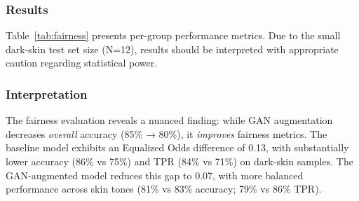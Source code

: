 \documentclass[10pt, twocolumn, letterpaper]{article}
\begin{document}
\subsubsection{Results}
Table~\ref{tab:fairness} presents per-group performance metrics. Due to the small dark-skin test set size (N=12), results should be interpreted with appropriate caution regarding statistical power.

\begin{table}[h]
\centering
\caption{Fairness Evaluation: Performance by Skin Tone Group}
\label{tab:fairness}
\vspace{0.2cm}
\end{table}

\subsubsection{Interpretation}
The fairness evaluation reveals a nuanced finding: while GAN augmentation decreases \textit{overall} accuracy (85\% → 80\%), it \textit{improves} fairness metrics. The baseline model exhibits an Equalized Odds difference of 0.13, with substantially lower accuracy (86\% vs 75\%) and TPR (84\% vs 71\%) on dark-skin samples. The GAN-augmented model reduces this gap to 0.07, with more balanced performance across skin tones (81\% vs 83\% accuracy; 79\% vs 86\% TPR).
\end{document}

